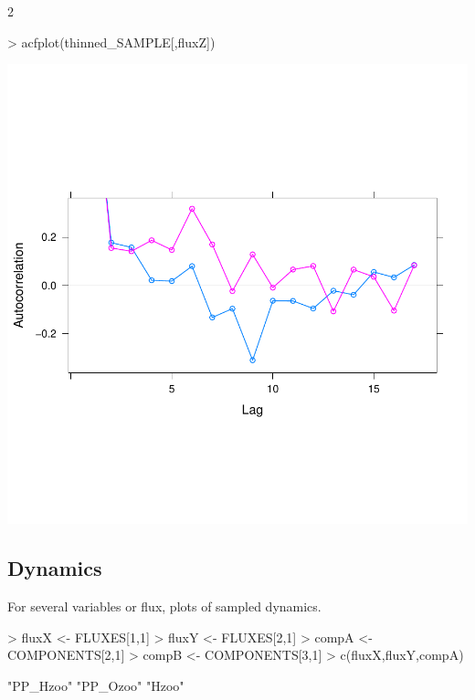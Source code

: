 \documentclass{article}
\begin{document}
\begin{Schunk}
\begin{Soutput}
[1] 2
\end{Soutput}
\begin{Sinput}
> acfplot(thinned_SAMPLE[,fluxZ])
\end{Sinput}
\end{Schunk}
\includegraphics{barents_SM-015}

\clearpage

\subsection{Dynamics}

For several variables or flux, plots of sampled dynamics. 
\begin{Schunk}
\begin{Sinput}
> fluxX <- FLUXES[1,1]
> fluxY <- FLUXES[2,1]
> compA <- COMPONENTS[2,1] 
> compB <- COMPONENTS[3,1] 
> c(fluxX,fluxY,compA)
\end{Sinput}
\begin{Soutput}
[1] "PP_Hzoo" "PP_Ozoo" "Hzoo"   
\end{Soutput}
\end{Schunk}
\end{document}
